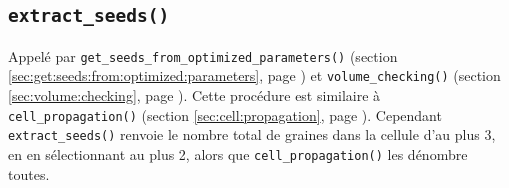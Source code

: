 \documentclass{article}
\def \mycolor {red}
\begin{document}
\subsection{\texttt{extract\_seeds()}}
\label{sec:extract:seeds}

\color{\mycolor}
Appel\'e par \texttt{get\_seeds\_from\_optimized\_parameters()} (section \ref{sec:get:seeds:from:optimized:parameters}, page \pageref{sec:get:seeds:from:optimized:parameters}) et \texttt{volume\_checking()}
(section \ref{sec:volume:checking}, page \pageref{sec:volume:checking}). Cette proc\'edure est similaire \`a \texttt{cell\_propagation()}
(section \ref{sec:cell:propagation}, page \pageref{sec:cell:propagation}). 
Cependant \texttt{extract\_seeds()} renvoie le nombre total de graines dans la cellule d'au plus 3, en en s\'electionnant au plus 2, alors que \texttt{cell\_propagation()} les d\'enombre toutes.
\color{black}
\end{document}
